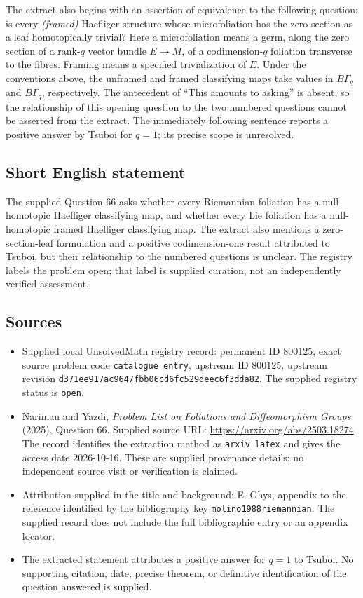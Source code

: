 \documentclass[11pt]{article}
\begin{document}
The extract also begins with an assertion of equivalence to the following question: is every \emph{(framed)} Haefliger structure whose microfoliation has the zero section as a leaf homotopically trivial? Here a microfoliation means a germ, along the zero section of a rank-\(q\) vector bundle \(E\to M\), of a codimension-\(q\) foliation transverse to the fibres. Framing means a specified trivialization of \(E\). Under the conventions above, the unframed and framed classifying maps take values in \(B\Gamma_q\) and \(B\bar\Gamma_q\), respectively. The antecedent of ``This amounts to asking'' is absent, so the relationship of this opening question to the two numbered questions cannot be asserted from the extract. The immediately following sentence reports a positive answer by Tsuboi for \(q=1\); its precise scope is unresolved.
\subsection{Short English statement}
The supplied Question 66 asks whether every Riemannian foliation has a null-homotopic Haefliger classifying map, and whether every Lie foliation has a null-homotopic framed Haefliger classifying map. The extract also mentions a zero-section-leaf formulation and a positive codimension-one result attributed to Tsuboi, but their relationship to the numbered questions is unclear. The registry labels the problem open; that label is supplied curation, not an independently verified assessment.
\subsection{Sources}
\begin{itemize}
\item Supplied local UnsolvedMath registry record: permanent ID \(800125\), exact source problem code \texttt{catalogue entry}, upstream ID \(800125\), upstream revision \texttt{d371ee917ac9647fbb06cd6fc529deec6f3dda82}. The supplied registry status is \texttt{open}.
\item Nariman and Yazdi, \emph{Problem List on Foliations and Diffeomorphism Groups} (2025), Question 66. Supplied source URL: \url{https://arxiv.org/abs/2503.18274}. The record identifies the extraction method as \texttt{arxiv\_latex} and gives the access date 2026-10-16. These are supplied provenance details; no independent source visit or verification is claimed.
\item Attribution supplied in the title and background: E. Ghys, appendix to the reference identified by the bibliography key \texttt{molino1988riemannian}. The supplied record does not include the full bibliographic entry or an appendix locator.
\item The extracted statement attributes a positive answer for \(q=1\) to Tsuboi. No supporting citation, date, precise theorem, or definitive identification of the question answered is supplied.
\end{itemize}
\end{document}
